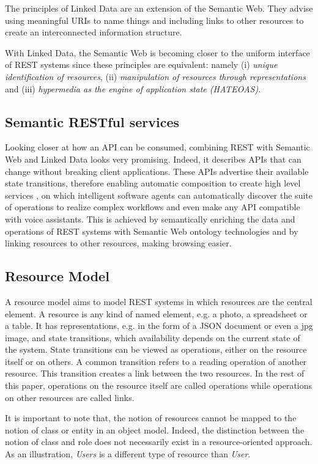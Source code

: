 The principles of Linked Data are an extension of the Semantic Web. They advise using meaningful URIs to name things and including links to other resources to create an interconnected information structure. 

With Linked Data, the Semantic Web is becoming closer to the uniform interface of REST systems since these principles are equivalent: namely (i) \textit{unique identification of resources}, (ii) \textit{manipulation of resources through representations} and (iii) \textit{hypermedia as the engine of application state (HATEOAS)}. 

\subsection{Semantic RESTful services}

Looking closer at how an API can be consumed, combining REST with Semantic Web and Linked Data looks very promising. Indeed, it describes APIs that can change without breaking client applications. These APIs advertise their available state transitions, therefore enabling automatic composition to create high level services \cite{alarcon2015rest}, on which intelligent software agents can automatically discover the suite of operations to realize complex workflows and even make any API compatible with voice assistants. This is achieved by semantically enriching the data and operations of REST systems with Semantic Web ontology technologies and by linking resources to other resources, making browsing easier.

\subsection{Resource Model}

A resource model aims to model REST systems in which resources are the central element. A resource is any kind of named element, e.g. a photo, a spreadsheet or a table. It has representations, e.g. in the form of a JSON document or even a jpg image, and state transitions, which availability depends on the current state of the system. State transitions can be viewed as operations, either on the resource itself or on others. A common transition refers to a reading operation of another resource. This transition creates a link between the two resources. In the rest of this paper, operations on the resource itself are called operations while operations on other resources are called links.

It is important to note that, the notion of resources cannot be mapped to the notion of class or entity in an object model. Indeed, the distinction between the notion of class and role does not necessarily exist in a resource-oriented approach. As an illustration, \emph{Users} is a different type of resource than \emph{User}.

